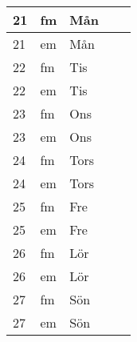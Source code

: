 \documentclass[a4paper]{article}
\begin{document}
\begin{table}[ht!]
\begin{tabular}{lllp{7cm}p{7cm}}
\multicolumn{1}{|l|}{21} & \multicolumn{1}{l|}{fm} & \multicolumn{1}{l|}{Mån} & \multicolumn{1}{l|}{} & \multicolumn{1}{l|}{} \\ \hline
\multicolumn{1}{|l|}{21} & \multicolumn{1}{l|}{em} & \multicolumn{1}{l|}{Mån} & \multicolumn{1}{l|}{} & \multicolumn{1}{l|}{} \\ \hline    

\multicolumn{1}{|l|}{22} & \multicolumn{1}{l|}{fm} & \multicolumn{1}{l|}{Tis} & \multicolumn{1}{l|}{} & \multicolumn{1}{l|}{} \\ \hline
\multicolumn{1}{|l|}{22} & \multicolumn{1}{l|}{em} & \multicolumn{1}{l|}{Tis} & \multicolumn{1}{l|}{} & \multicolumn{1}{l|}{} \\ \hline    

\multicolumn{1}{|l|}{23} & \multicolumn{1}{l|}{fm} & \multicolumn{1}{l|}{Ons} & \multicolumn{1}{l|}{} & \multicolumn{1}{l|}{} \\ \hline
\multicolumn{1}{|l|}{23} & \multicolumn{1}{l|}{em} & \multicolumn{1}{l|}{Ons} & \multicolumn{1}{l|}{} & \multicolumn{1}{l|}{} \\ \hline    

\multicolumn{1}{|l|}{24} & \multicolumn{1}{l|}{fm} & \multicolumn{1}{l|}{Tors} & \multicolumn{1}{l|}{} & \multicolumn{1}{l|}{} \\ \hline
\multicolumn{1}{|l|}{24} & \multicolumn{1}{l|}{em} & \multicolumn{1}{l|}{Tors} & \multicolumn{1}{l|}{} & \multicolumn{1}{l|}{} \\ \hline    

\multicolumn{1}{|l|}{25} & \multicolumn{1}{l|}{fm} & \multicolumn{1}{l|}{Fre} & \multicolumn{1}{l|}{} & \multicolumn{1}{l|}{} \\ \hline
\multicolumn{1}{|l|}{25} & \multicolumn{1}{l|}{em} & \multicolumn{1}{l|}{Fre} & \multicolumn{1}{l|}{} & \multicolumn{1}{l|}{} \\ \hline    

\multicolumn{1}{|l|}{26} & \multicolumn{1}{l|}{fm} & \multicolumn{1}{l|}{Lör} & \multicolumn{1}{l|}{} & \multicolumn{1}{l|}{} \\ \hline
\multicolumn{1}{|l|}{26} & \multicolumn{1}{l|}{em} & \multicolumn{1}{l|}{Lör} & \multicolumn{1}{l|}{} & \multicolumn{1}{l|}{} \\ \hline    

\multicolumn{1}{|l|}{27} & \multicolumn{1}{l|}{fm} & \multicolumn{1}{l|}{Sön} & \multicolumn{1}{l|}{} & \multicolumn{1}{l|}{} \\ \hline
\multicolumn{1}{|l|}{27} & \multicolumn{1}{l|}{em} & \multicolumn{1}{l|}{Sön} & \multicolumn{1}{l|}{} & \multicolumn{1}{l|}{} \\ \hline    


\end{tabular}
\end{table}
\end{document}
